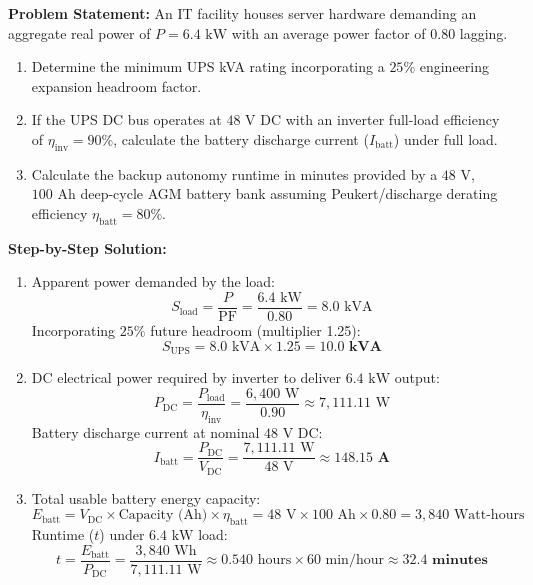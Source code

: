 \begin{tcolorbox}[colback=white,colframe=navyblue,title=\textbf{Problem 9: Online UPS Sizing and Battery Backup Runtime}]
\textbf{Problem Statement:} An IT facility houses server hardware demanding an aggregate real power of $P = 6.4\text{ kW}$ with an average power factor of $0.80$ lagging.
\begin{enumerate}[label=(\alph*),leftmargin=*]
    \item Determine the minimum UPS kVA rating incorporating a $25\%$ engineering expansion headroom factor.
    \item If the UPS DC bus operates at $48\text{ V DC}$ with an inverter full-load efficiency of $\eta_{\text{inv}} = 90\%$, calculate the battery discharge current ($I_{\text{batt}}$) under full load.
    \item Calculate the backup autonomy runtime in minutes provided by a $48\text{ V}$, $100\text{ Ah}$ deep-cycle AGM battery bank assuming Peukert/discharge derating efficiency $\eta_{\text{batt}} = 80\%$.
\end{enumerate}
\textbf{Step-by-Step Solution:}
\begin{enumerate}[label=(\alph*),leftmargin=*]
    \item Apparent power demanded by the load:
    \[
    S_{\text{load}} = \frac{P}{\text{PF}} = \frac{6.4\text{ kW}}{0.80} = 8.0\text{ kVA}
    \]
    Incorporating $25\%$ future headroom (multiplier 1.25):
    \[
    S_{\text{UPS}} = 8.0\text{ kVA} \times 1.25 = \mathbf{10.0\text{ kVA}}
    \]
    \item DC electrical power required by inverter to deliver $6.4\text{ kW}$ output:
    \[
    P_{\text{DC}} = \frac{P_{\text{load}}}{\eta_{\text{inv}}} = \frac{6,400\text{ W}}{0.90} \approx 7,111.11\text{ W}
    \]
    Battery discharge current at nominal $48\text{ V DC}$:
    \[
    I_{\text{batt}} = \frac{P_{\text{DC}}}{V_{\text{DC}}} = \frac{7,111.11\text{ W}}{48\text{ V}} \approx \mathbf{148.15\text{ A}}
    \]
    \item Total usable battery energy capacity:
    \[
    E_{\text{batt}} = V_{\text{DC}} \times \text{Capacity (Ah)} \times \eta_{\text{batt}} = 48\text{ V} \times 100\text{ Ah} \times 0.80 = 3,840\text{ Watt-hours}
    \]
    Runtime ($t$) under $6.4\text{ kW}$ load:
    \[
    t = \frac{E_{\text{batt}}}{P_{\text{DC}}} = \frac{3,840\text{ Wh}}{7,111.11\text{ W}} \approx 0.540\text{ hours} \times 60\text{ min/hour} \approx \mathbf{32.4\text{ minutes}}
    \]
\end{enumerate}
\end{tcolorbox}

